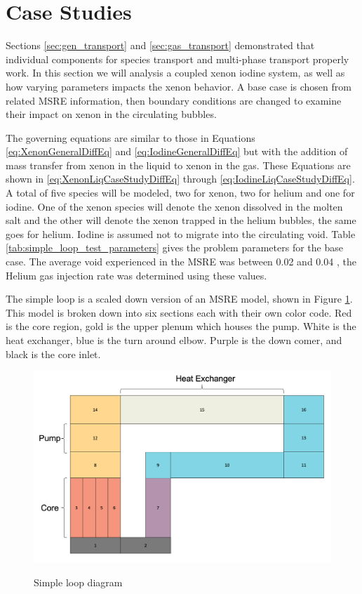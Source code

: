 \FloatBarrier
\newpage




\section{Case Studies}
Sections \ref{sec:gen_transport} and \ref{sec:gas_transport} demonstrated that individual components for species transport and multi-phase transport properly work. In this section we will analysis a coupled xenon iodine system, as well as how varying parameters impacts the xenon behavior. A base case is chosen from related MSRE information, then boundary conditions are changed to examine their impact on xenon in the circulating bubbles. 


The governing equations are similar to those in Equations \ref{eq:XenonGeneralDiffEq} and \ref{eq:IodineGeneralDiffEq} but with the addition of mass transfer from xenon in the liquid to xenon in the gas. These Equations are shown in \ref{eq:XenonLiqCaseStudyDiffEq} through \ref{eq:IodineLiqCaseStudyDiffEq}. A total of five species will be modeled, two for xenon, two for helium and one for iodine. One of the xenon species will denote the xenon dissolved in the molten salt and the other will denote the xenon trapped in the helium bubbles, the same goes for helium. Iodine is assumed not to migrate into the circulating void. Table \ref{tab:simple_loop_test_parameters} gives the problem parameters for the base case. The average void experienced in the MSRE was between 0.02 and 0.04 \cite{engel1971}, the Helium gas injection rate was determined using these values.

The simple loop is a scaled down version of an MSRE model, shown in Figure \ref{fig:simple_loop}. This model is broken down into six sections each with their own color code. Red is the core region, gold is the upper plenum which houses the pump. White is the heat exchanger, blue is the turn around elbow. Purple is the down comer, and black is the core inlet. 

\vspace{12.7mm} %

\begin{figure}[ht]
  \centering
  \includegraphics[width=5in]{images/simple_loop.png}\\
  \caption{Simple loop diagram}
  \label{fig:simple_loop}
\end{figure}

